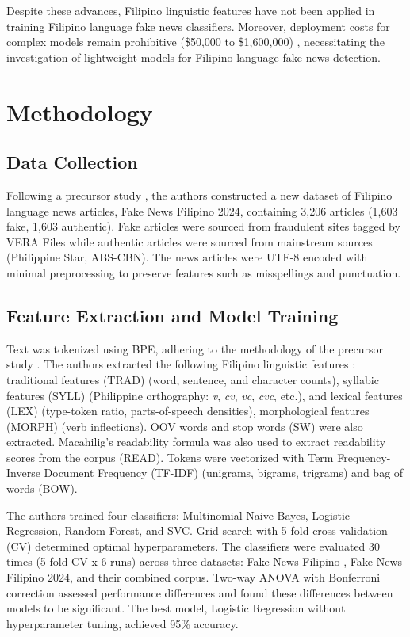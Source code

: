 \documentclass[conference]{IEEEtran}
\begin{document}
Despite these advances, Filipino linguistic features have not been applied in training Filipino language fake news classifiers. Moreover, deployment costs for complex models remain prohibitive (\$50,000 to \$1,600,000) \cite{b4}, necessitating the investigation of lightweight models for Filipino language fake news detection.

\section{Methodology}

\subsection{Data Collection}
Following a precursor study \cite{b3}, the authors constructed a new dataset of Filipino language news articles, Fake News Filipino 2024, containing 3,206 articles (1,603 fake, 1,603 authentic). Fake articles were sourced from fraudulent sites tagged by VERA Files while authentic articles were sourced from mainstream sources (Philippine Star, ABS-CBN). The news articles were UTF-8 encoded with minimal preprocessing to preserve features such as misspellings and punctuation.

\subsection{Feature Extraction and Model Training}
Text was tokenized using BPE, adhering to the methodology of the precursor study \cite{b3}. The authors extracted the following Filipino linguistic features \cite{b8,b9,b10}: traditional features (TRAD) (word, sentence, and character counts), syllabic features (SYLL) (Philippine orthography: \textit{v}, \textit{cv}, \textit{vc}, \textit{cvc}, etc.), and lexical features (LEX) (type-token ratio, parts-of-speech densities), morphological features (MORPH) (verb inflections). OOV words and stop words (SW) were also extracted. Macahilig's readability formula \cite{b10} was also used to extract readability scores from the corpus (READ). Tokens were vectorized with Term Frequency-Inverse Document Frequency (TF-IDF) (unigrams, bigrams, trigrams) and bag of words (BOW).

The authors trained four classifiers: Multinomial Naive Bayes, Logistic Regression, Random Forest, and SVC. Grid search with 5-fold cross-validation (CV) determined optimal hyperparameters. The classifiers were evaluated 30 times (5-fold CV x 6 runs) across three datasets: Fake News Filipino \cite{b3}, Fake News Filipino 2024, and their combined corpus. Two-way ANOVA with Bonferroni correction assessed performance differences and found these differences between models to be significant. The best model, Logistic Regression without hyperparameter tuning, achieved 95\% accuracy.
\end{document}
